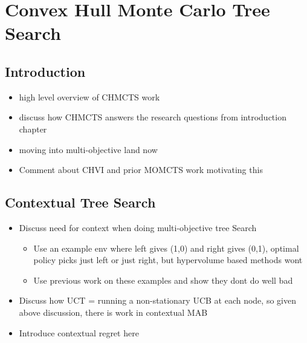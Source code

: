 

\chapter{\label{ch:5-chmcts}Convex Hull Monte Carlo Tree Search} 

    \minitoc


\section{Introduction}
\label{sec:5-1-intro}

    \begin{itemize}
        \item high level overview of CHMCTS work
        \item discuss how CHMCTS answers the research questions from introduction chapter
        \item moving into multi-objective land now
        \item Comment about CHVI and prior MOMCTS work motivating this
    \end{itemize}  

\section{Contextual Tree Search}
\label{sec:5-2-context}

    \begin{itemize}
        \item Discuss need for context when doing multi-objective tree Search
        \begin{itemize}
            \item Use an example env where left gives (1,0) and right gives (0,1), optimal policy picks just left or just right, but hypervolume based methods wont
            \item Use previous work on these examples and show they dont do well bad
        \end{itemize}
        \item Discuss how UCT = running a non-stationary UCB at each node, so given above discussion, there is work in contextual MAB  
        \item Introduce contextual regret here
    \end{itemize}

